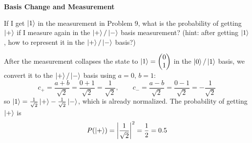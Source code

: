 \documentclass[a4paper, 10pt]{article}
\begin{document}
\begin{problem}
\textbf{Basis Change and Measurement}
\par If I get \( \ket{1} \) in the measurement in Problem 9, what is the probability of getting \( \ket{+} \) if I measure again in the \( \ket{+}/\ket{-} \) basis measurement?
(hint: after getting \( \ket{1} \), how to represent it in the \( \ket{+}/\ket{-} \) basis?)
\end{problem}

\begin{solution}
	After the measurement collapses the state to \( \ket{1} = \begin{pmatrix} 0 \\ 1 \end{pmatrix} \) in the \( \ket{0}/\ket{1} \) basis,
	we convert it to the \( \ket{+}/\ket{-} \) basis using \( a = 0,\, b = 1 \):
	\[
		c_+ = \frac{a + b}{\sqrt{2}} = \frac{0 + 1}{\sqrt{2}} = \frac{1}{\sqrt{2}}, \qquad
		c_- = \frac{a - b}{\sqrt{2}} = \frac{0 - 1}{\sqrt{2}} = -\frac{1}{\sqrt{2}}
	\]
	so \( \ket{1} = \frac{1}{\sqrt{2}} \ket{+} - \frac{1}{\sqrt{2}} \ket{-} \), which is already normalized.
	The probability of getting \( \ket{+} \) is
	\[
		P(\ket{+}) = \left|\frac{1}{\sqrt{2}}\right|^2 = \frac{1}{2} = 0.5
	\]
\end{solution}



\end{document}
